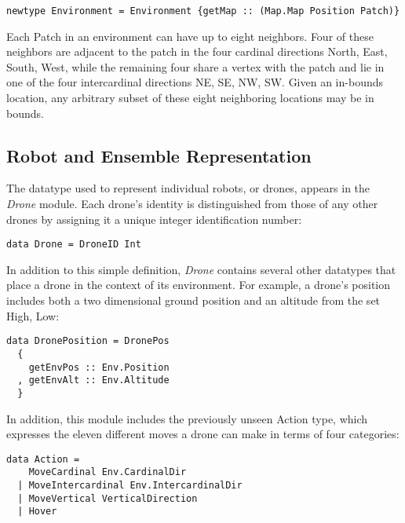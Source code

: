 
\begin{verbatim}
newtype Environment = Environment {getMap :: (Map.Map Position Patch)}
\end{verbatim}

Each Patch in an environment can have up to eight neighbors. Four of these neighbors are adjacent to the patch in the four cardinal directions {North, East, South, West}, while the remaining four share a vertex with the patch and lie in one of the four intercardinal directions {NE, SE, NW, SW}. Given an in-bounds location, any arbitrary subset of these eight neighboring locations may be in bounds.

\subsection{Robot and Ensemble Representation}


The datatype used to represent individual robots, or drones, appears in the \textit{Drone} module. Each drone's identity is distinguished from those of any other drones by assigning it a unique integer identification number:

\begin{verbatim}
data Drone = DroneID Int
\end{verbatim}

In addition to this simple definition, \textit{Drone} contains several other datatypes that place a drone in the context of its environment. For example, a drone's position includes both a two dimensional ground position and an altitude from the set {High, Low}:

\begin{verbatim}
data DronePosition = DronePos 
  {
    getEnvPos :: Env.Position
  , getEnvAlt :: Env.Altitude
  }
\end{verbatim}

In addition, this module includes the previously unseen Action type, which expresses the eleven different moves a drone can make in terms of four categories:

\begin{verbatim}
data Action =
    MoveCardinal Env.CardinalDir
  | MoveIntercardinal Env.IntercardinalDir
  | MoveVertical VerticalDirection
  | Hover
\end{verbatim}

